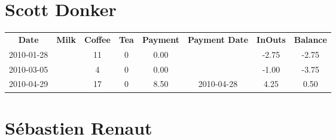\section{Scott Donker}

\begin{center}
\begin{tabular}{cccccccc}
\textbf{Date} & \textbf{Milk} & \textbf{Coffee} & \textbf{Tea} & \textbf{Payment} & \textbf{Payment Date} & \textbf{InOuts} & \textbf{Balance} \\
2010-01-28 &  & 11 & 0 & 0.00 &  & -2.75 & -2.75\\ 
2010-03-05 &  &  4 & 0 & 0.00 &  & -1.00 & -3.75\\ 
2010-04-29 &  & 17 & 0 & 8.50 & 2010-04-28 &  4.25 &  0.50
\end{tabular}
\end{center}

\section{S\'ebastien Renaut}

